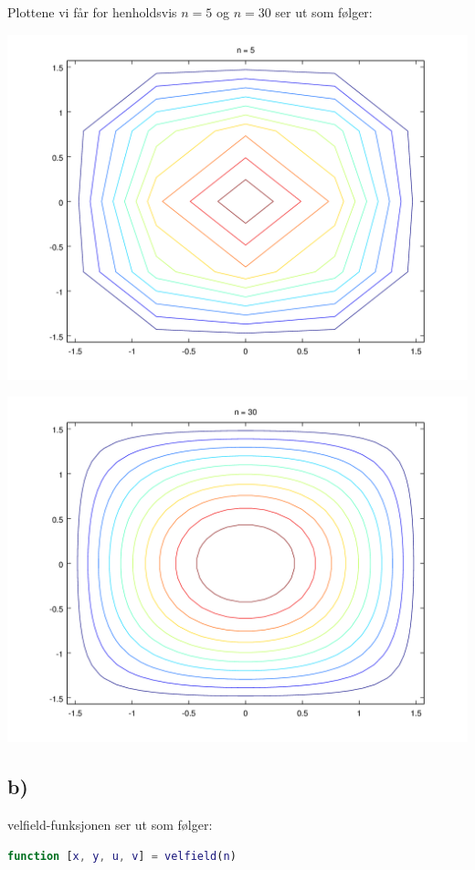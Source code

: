 \documentclass{article}
\begin{document}
\begin{flushle}
\begin{flushleft}
Plottene vi får for henholdsvis \(n=5\) og \(n=30\) ser ut som følger:
\end{flushleft}

\includegraphics[scale=0.6]{images/Problem4a_5}

\includegraphics[scale=0.6]{images/Problem4a_30}

%
%

\subsection*{b)}

\begin{flushleft}
velfield-funksjonen ser ut som følger:
\end{flushleft}
\begin{lstlisting}[language=Matlab]
function [x, y, u, v] = velfield(n)


\end{lstlisting}
\end{flushle}
\end{document}
